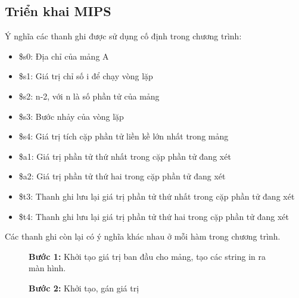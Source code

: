 \documentclass[a4paper,12pt]{article}
\begin{document}
\subsection{Triển khai MIPS}
Ý nghĩa các thanh ghi được sử dụng cố định trong chương trình:
\begin{itemize}
    \item \$s0: Địa chỉ của mảng A
    \item \$s1: Giá trị chỉ số i để chạy vòng lặp
    \item \$s2: n-2, với n là số phần tử của mảng
    \item \$s3: Bước nhảy của vòng lặp
    \item \$s4: Giá trị tích cặp phần tử liền kề lớn nhất trong mảng
    \item \$a1:	Giá trị phần tử thứ nhất trong cặp phần tử đang xét	
    \item \$a2:	Giá trị phần tử thứ hai trong cặp phần tử đang xét
    \item \$t3: Thanh ghi lưu lại giá trị phần tử thứ nhất trong cặp phần tử đang xét
    \item \$t4: Thanh ghi lưu lại giá trị phần tử thứ hai trong cặp phần tử đang xét
\end{itemize}
Các thanh ghi còn lại có ý nghĩa khác nhau ở mỗi hàm trong chương trình.
\begin{figure}[!h]
	\centerline{}
	\caption*{\textbf{Bước 1:} Khởi tạo giá trị ban đầu cho mảng, tạo các string in ra màn hình.}
	\label{fig:data6}
\end{figure}
\clearpage
\begin{figure}[!h]
	\centerline{}
	\caption*{\textbf{Bước 2:} Khởi tạo, gán giá trị}
	\label{fig:data6}
\end{figure}
\end{document}
